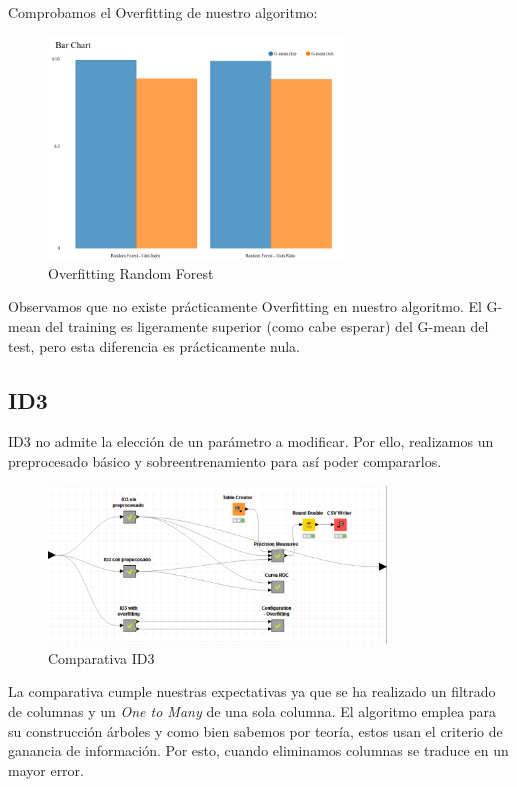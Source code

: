 	
	Comprobamos el Overfitting de nuestro algoritmo:
	
	\begin{figure}[H]
		\centering
		\includegraphics[width=0.7\textwidth]{img/sobrerf.png}
		\caption{Overfitting Random Forest}
	\end{figure}

	Observamos que no existe prácticamente Overfitting en nuestro algoritmo. El G-mean del training es ligeramente superior (como cabe esperar) del G-mean del test, pero esta diferencia es prácticamente nula.

	\subsection{ID3}
	
	\hspace{1cm} ID3 no admite la elección de un parámetro a modificar. Por ello, realizamos un preprocesado básico y sobreentrenamiento para así poder compararlos.
	\begin{figure}[H]
		\centering
		\includegraphics[width=0.8\textwidth]{img/id3comp.png}
		\caption{Comparativa ID3}
	\end{figure}

	La comparativa cumple nuestras expectativas ya que se ha realizado un filtrado de columnas y un \textit{One to Many} de una sola columna. El algoritmo emplea para su construcción árboles y como bien sabemos por teoría, estos usan el criterio de ganancia de información. Por esto, cuando eliminamos columnas se traduce en un mayor error.
	
